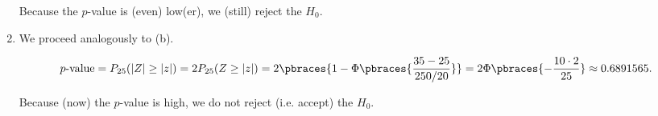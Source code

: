 \begin{solution}
\begin{enumerate}[label = (\alph*)]
    Because the $p$-value is (even) low(er), we (still) reject the $H_0$.

    \item We proceed analogously to (b).

    \begin{align*}
        \text{$p$-value}
        =
        P_{25}(|Z| \geq |z|)
        =
        2 P_{25}(Z \geq |z|)
        =
        2 \pbraces{1 - \Phi \pbraces{\frac{35 - 25}{250 / 20}}}
        =
        2 \Phi \pbraces{-\frac{10 \cdot 2}{25}}
        \approx
        0.6891565.
    \end{align*}

    Because (now) the $p$-value is high, we do not reject (i.e. accept) the $H_0$.

\end{enumerate}

\end{solution}

